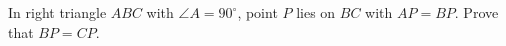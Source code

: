In right triangle $ABC$ with $\angle A=90^\circ$, point $P$ lies on $BC$ with $AP=BP$. Prove that $BP=CP$.
